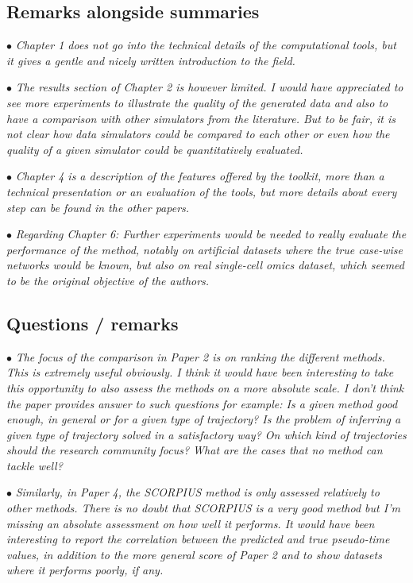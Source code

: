 \documentclass[10pt]{article}
\newcommand{\exam}[2][\  ]{\hspace{0pt}\marginpar{\color{red}#1}$\bullet$ \textit{#2}}
\newcommand{\imp}[1]{{\color{red} #1}}
\newcommand{\bigexclaim}{\raisebox{-0.1em}{\BigTriangleUp}\hspace{-0.32em}\llap{\small\textbf{!}}\hspace{0.32em}}
\newcommand{\tagimp}{\bigexclaim}
\begin{document}
{\subsection{Remarks alongside summaries}
\exam{Chapter 1 does not go into the technical details of the computational tools, but it gives a gentle and nicely written introduction to the field.}

\exam{The results
	section of Chapter 2 is however limited. I would have appreciated to see more experiments to illustrate the
	quality of the generated data and also to have a comparison with other simulators from the
	literature. But to be fair, it is not clear how data simulators could be compared to each other or
	even how the quality of a given simulator could be quantitatively evaluated.}

\exam{Chapter 4 is a description of the features offered by the toolkit, more than a technical presentation
	or an evaluation of the tools, but more details about every step can be found in the other papers.}

\exam{Regarding Chapter 6: Further experiments
	would be needed to really evaluate the performance of the method, notably on artificial datasets
	where the true case-wise networks would be known, but also on real single-cell omics dataset,
	which seemed to be the original objective of the authors.}

\subsection{Questions / remarks} 

\exam[\tagimp]{The focus of the comparison in Paper 2 is on ranking the different methods. This is extremely
	useful obviously. \imp{I think it would have been interesting to take this opportunity to also assess
	the methods on a more absolute scale.} I don’t think the paper provides answer to such
	questions for example: Is a given method good enough, in general or for a given type of
	trajectory? Is the problem of inferring a given type of trajectory solved in a satisfactory way?
	On which kind of trajectories should the research community focus? What are the cases that
	no method can tackle well?}

\exam{Similarly, in Paper 4, the SCORPIUS method is only assessed relatively to other methods.
	There is no doubt that SCORPIUS is a very good method but I’m missing an absolute
	assessment on how well it performs. It would have been interesting to report the correlation
	between the predicted and true pseudo-time values, in addition to the more general score of
	Paper 2 and to show datasets where it performs poorly, if any.}

}
\end{document}
